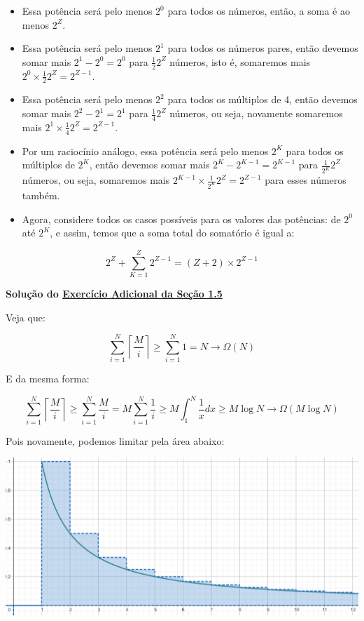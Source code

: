 \documentclass[11pt, a4paper]{article}
\begin{document}
\begin{itemize}
    \item Essa potência será pelo menos \(2^0\) para todos os números, então, a soma é ao menos \(2^Z\). 
    
    \item Essa potência será pelo menos \(2^1\) para todos os números pares, então devemos somar mais \(2^1 - 2^0=2^0\) para \(\frac{1}{2}2^Z\) números, isto é, somaremos mais \(2^0\times\frac{1}{2}2^Z=2^{Z-1}\).

    \item Essa potência será pelo menos \(2^2\) para todos os múltiplos de 4, então devemos somar mais \(2^2 - 2^1=2^1\) para \(\frac{1}{4}2^Z\) números, ou seja, novamente somaremos mais \(2^1\times\frac{1}{4}2^Z=2^{Z-1}\).

    \item Por um raciocínio análogo, essa potência será pelo menos \(2^K\) para todos os múltiplos de \(2^K\), então devemos somar mais \(2^K - 2^{K-1}=2^{K-1}\) para \(\frac{1}{2^{K}}2^Z\) números, ou seja, somaremos mais \(2^{K-1}\times\frac{1}{2^K}2^Z=2^{Z-1}\) para esses números também.

    \item Agora, considere todos os casos possíveis para os valores das potências: de \(2^0\) até \(2^K\), e assim, temos que a soma total do somatório é igual a:
\end{itemize}
\void[-1]

\[2^Z+\sum_{K=1}^{Z}{2^{Z-1}}=(Z+2)\times 2^{Z-1}\]

\newpage

\label{sol_ex1.5.a}
\textbf{Solução do \hyperref[ex1.5.a]{Exercício Adicional da Seção 1.5}}

Veja que: 

    \void[-1.6]
    
    \[\sum_{i=1}^{N}\left\lceil\frac{M}{i}\right\rceil\geq\sum_{i=1}^{N}{1}=N \rightarrow \Omega(N)\]

    E da mesma forma:

    \[\sum_{i=1}^{N}\left\lceil\frac{M}{i}\right\rceil \geq \sum_{i=1}^{N}{\frac{M}{i}}=M\sum_{i=1}^{N}{\frac{1}{i}}\geq M \int_{1}^{N}{\frac{1}{x}dx} \geq M \log N \rightarrow \Omega(M \log N)\]

    Pois novamente, podemos limitar pela área abaixo:

    \includegraphics[width=36em]{Imagens/harmonicarea.png}
\end{document}
